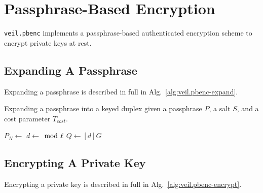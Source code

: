 \section{Passphrase-Based Encryption}\label{sec:veil.pbenc}

\texttt{veil.pbenc} implements a passphrase-based authenticated encryption scheme to encrypt private keys at rest.

\subsection{Expanding A Passphrase}\label{subsec:veil.pbenc-expand}

Expanding a passphrase is described in full in Alg.~\ref{alg:veil.pbenc-expand}\@.

\begin{algorithm}[ht]
    \caption{
        Expanding a passphrase into a keyed duplex given a passphrase $P$, a salt $S$, and a cost parameter $T_{cost}$.
    }
    \begin{algorithmic}
            \State $P_N \gets$
            \State {}
            \State {}
            \State {}
            \State {}
                \State {}
                \State $d \gets$  $\bmod~\ell$
                \State $Q \gets [d]G$
                \State {}
            \EndFor
            \State {}
        \EndProcedure
    \end{algorithmic}
    \label{alg:veil.pbenc-expand}
\end{algorithm}

\subsection{Encrypting A Private Key}\label{subsec:veil.pbenc-encrypt}

Encrypting a private key is described in full in Alg.~\ref{alg:veil.pbenc-encrypt}\@.

